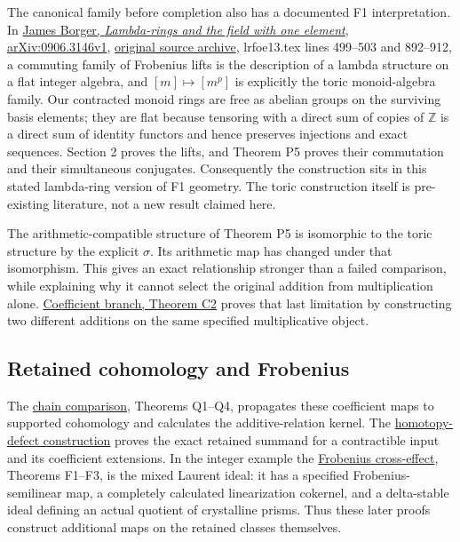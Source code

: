 \documentclass[
]{article}
\begin{document}
The canonical family before completion also has a documented F1
interpretation. In \href{https://arxiv.org/abs/0906.3146v1}{James
Borger, \emph{Lambda-rings and the field with one element},
arXiv:0906.3146v1}, \href{https://arxiv.org/src/0906.3146v1}{original
source archive}, lrfoe13.tex lines 499--503 and 892--912, a commuting
family of Frobenius lifts is the description of a lambda structure on a
flat integer algebra, and \([m]\mapsto[m^p]\) is explicitly the toric
monoid-algebra family. Our contracted monoid rings are free as abelian
groups on the surviving basis elements; they are flat because tensoring
with a direct sum of copies of \(\mathbb Z\) is a direct sum of identity
functors and hence preserves injections and exact sequences. Section 2
proves the lifts, and Theorem P5 proves their commutation and their
simultaneous conjugates. Consequently the construction sits in this
stated lambda-ring version of F1 geometry. The toric construction itself
is pre-existing literature, not a new result claimed here.

The arithmetic-compatible structure of Theorem P5 is isomorphic to the
toric structure by the explicit \(\sigma\). Its arithmetic map has
changed under that isomorphism. This gives an exact relationship
stronger than a failed comparison, while explaining why it cannot select
the original addition from multiplication alone.
\href{https://github.com/KokunoYumeto/zeta-function-research-reader/blob/6af54ea3c8ef99127af327f3103e086c68d482c2/workbenches/splitzero-tandem/branches/identity-absorber-square/COEFFICIENT_BRANCH.md}{Coefficient
branch, Theorem C2} proves that last limitation by constructing two
different additions on the same specified multiplicative object.

\subsection{Retained cohomology and
Frobenius}\label{retained-cohomology-and-frobenius}

The
\href{https://github.com/KokunoYumeto/zeta-function-research-reader/blob/6af54ea3c8ef99127af327f3103e086c68d482c2/workbenches/splitzero-tandem/branches/identity-absorber-square/CHAIN_COMPARISON.md}{chain
comparison}, Theorems Q1--Q4, propagates these coefficient maps to
supported cohomology and calculates the additive-relation kernel. The
\href{https://github.com/KokunoYumeto/zeta-function-research-reader/blob/6af54ea3c8ef99127af327f3103e086c68d482c2/workbenches/splitzero-tandem/branches/identity-absorber-square/HOMOTOPY_DEFECT.md}{homotopy-defect
construction} proves the exact retained summand for a contractible input
and its coefficient extensions. In the integer example the
\href{https://github.com/KokunoYumeto/zeta-function-research-reader/blob/6af54ea3c8ef99127af327f3103e086c68d482c2/workbenches/splitzero-tandem/branches/identity-absorber-square/FROBENIUS_CROSS_EFFECT.md}{Frobenius
cross-effect}, Theorems F1--F3, is the mixed Laurent ideal: it has a
specified Frobenius-semilinear map, a completely calculated
linearization cokernel, and a delta-stable ideal defining an actual
quotient of crystalline prisms. Thus these later proofs construct
additional maps on the retained classes themselves.
\end{document}
